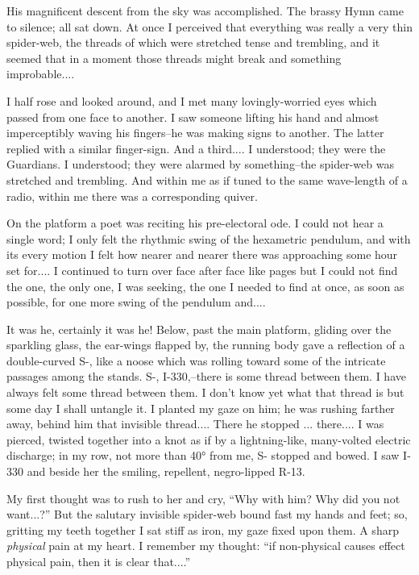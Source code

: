 \documentclass[11pt,openany]{book}
\begin{document}
His magnificent descent from the sky was accomplished. The brassy Hymn came to silence; all sat down. At once I perceived that everything was really a very thin spider-web, the threads of which were stretched tense and trembling, and it seemed that in a moment those threads might break and something improbable....

I half rose and looked around, and I met many lovingly-worried eyes which passed from one face to another. I saw someone lifting his hand and almost imperceptibly waving his fingers--he was making signs to another. The latter replied with a similar finger-sign. And a third.... I understood; they were the Guardians. I understood; they were alarmed by something--the spider-web was stretched and trembling. And within me as if tuned to the same wave-length of a radio, within me there was a corresponding quiver.

On the platform a poet was reciting his pre-electoral ode. I could not hear a single word; I only felt the rhythmic swing of the hexametric pendulum, and with its every motion I felt how nearer and nearer there was approaching some hour set for.... I continued to turn over face after face like pages but I could not find the one, the only one, I was seeking, the one I needed to find at once, as soon as possible, for one more swing of the pendulum and....

It was he, certainly it was he! Below, past the main platform, gliding over the sparkling glass, the ear-wings flapped by, the running body gave a reflection of a double-curved S-, like a noose which was rolling toward some of the intricate passages among the stands. S-, I-330,--there is some thread between them. I have always felt some thread between them. I don't know yet what that thread is but some day I shall untangle it. I planted my gaze on him; he was rushing farther away, behind him that invisible thread.... There he stopped ... there.... I was pierced, twisted together into a knot as if by a lightning-like, many-volted electric discharge; in my row, not more than 40° from me, S- stopped and bowed. I saw I-330 and beside her the smiling, repellent, negro-lipped R-13.

My first thought was to rush to her and cry, ``Why with him? Why did you not want...?'' But the salutary invisible spider-web bound fast my hands and feet; so, gritting my teeth together I sat stiff as iron, my gaze fixed upon them. A sharp \emph{physical} pain at my heart. I remember my thought: ``if non-physical causes effect physical pain, then it is clear that....''
\end{document}
